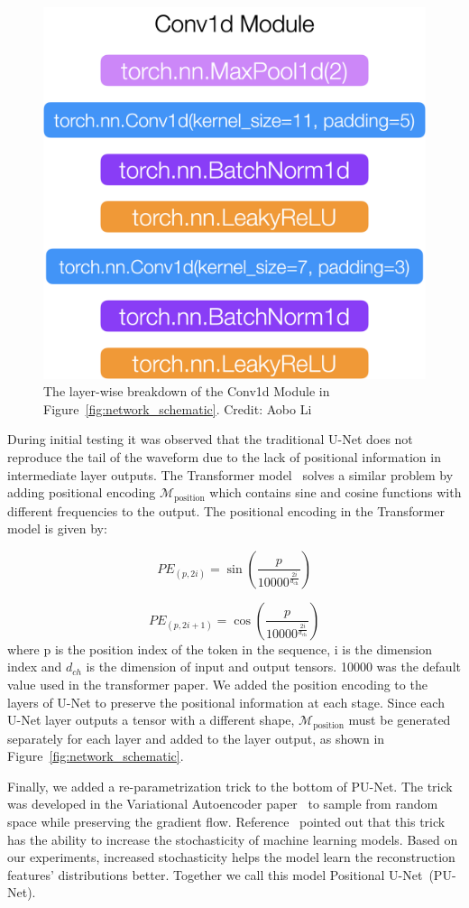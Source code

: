 \begin{figure}[htb!]
    \centering
    \includegraphics[width=0.3\linewidth,trim={0pc 0pc 0pc 0pc},clip]{ch6/figs/conv1d.png}
    \caption{The layer-wise breakdown of the Conv1d Module in Figure~\ref{fig:network_schematic}.  Credit: Aobo Li}
    \label{ch6:fig:cov1d_break_down}
\end{figure}

During initial testing it was observed that the traditional U-Net does not reproduce the tail of the waveform due to the lack of positional information in intermediate layer outputs. The Transformer model~\cite{Transformer} solves a similar problem by adding positional encoding $\mathcal{M}_{\mathrm{position}}$ which contains sine and cosine functions with different frequencies to the output. The positional encoding in the Transformer model is given by:

\begin{equation}
PE_{(p, 2i)} = \sin\left(\frac{p}{10000^{\frac{2i}{d_{\text{ch}}}}}\right)
\label{eqn:positional_encoding_sin}
\end{equation}

\begin{equation}
PE_{(p, 2i+1)} = \cos\left(\frac{p}{10000^{\frac{2i}{d_{\text{ch}}}}}\right)
\label{eqn:positional_encoding_cos}
\end{equation}
where p is the position index of the token in the sequence, i is the dimension index and $d_{ch}$ is the dimension of input and output tensors. 10000 was the default value used in the transformer paper. We added the position encoding to the layers of U-Net to preserve the positional information at each stage. Since each U-Net layer outputs a tensor with a different shape, $\mathcal{M}_{\mathrm{position}}$ must be generated separately for each layer and added to the layer output, as shown in Figure~\ref{fig:network_schematic}.



Finally, we added a re-parametrization trick to the bottom of PU-Net. The trick was developed in the Variational Autoencoder paper~\cite{VAE} to sample from random space while preserving the gradient flow. Reference~\cite{AAE} pointed out that this trick has the ability to increase the stochasticity of machine learning models. Based on our experiments, increased stochasticity helps the model learn the reconstruction features' distributions better. Together we call this model Positional U-Net~(PU-Net).

